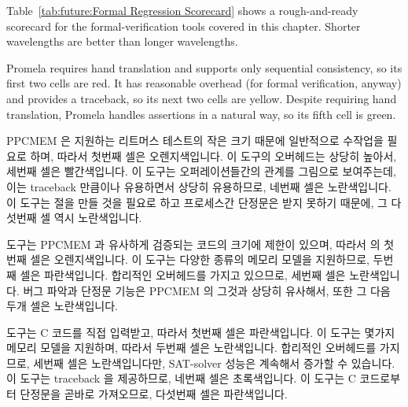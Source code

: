 Table~\ref{tab:future:Formal Regression Scorecard}
shows a rough-and-ready scorecard for the formal-verification tools
covered in this chapter.
Shorter wavelengths are better than longer wavelengths.

Promela requires hand translation and supports only sequential
consistency, so its first two cells are red.
It has reasonable overhead (for formal verification, anyway)
and provides a traceback, so its next two cells are yellow.
Despite requiring hand translation, Promela handles assertions
in a natural way, so its fifth cell is green.
\fi

PPCMEM 은 지원하는 리트머스 테스트의 작은 크기 때문에 일반적으로 수작업을
필요로 하며, 따라서 첫번째 셀은 오렌지색입니다.
이 도구의 오버헤드는 상당히 높아서, 세번째 셀은 빨간색입니다.
이 도구는 오퍼레이션들간의 관계를 그림으로 보여주는데, 이는 traceback 만큼이나
유용하면서 상당히 유용하므로, 네번째 셀은 노란색입니다.
이 도구는  절을 만들 것을 필요로 하고 프로세스간 단정문은 받지
못하기 때문에, 그 다섯번째 셀 역시 노란색입니다.

 도구는 PPCMEM 과 유사하게 검증되는 코드의 크기에 제한이 있으며,
따라서  의 첫번째 셀은 오렌지색입니다.
이 도구는 다양한 종류의 메모리 모델을 지원하므로, 두번째 셀은 파란색입니다.
합리적인 오버헤드를 가지고 있으므로, 세번째 셀은 노란색입니다.
버그 파악과 단정문 기능은 PPCMEM 의 그것과 상당히 유사해서,  또한 그
다음 두개 셀은 노란색입니다.
\iffalse

PPCMEM usually requires hand translation due to the small size of litmus
tests that it supports, so its first cell is orange.
It handles several memory models, so its second cell is green.
Its overhead is quite high, so its third cell is red.
It provides a graphical display of relations among operations, which
is not as helpful as a traceback, but is still quite useful, so its
fourth cell is yellow.
It requires constructing an \co{exists} clause and cannot take
intra-process assertions, so its fifth cell is also yellow.

The \co{herd} tool has size restrictions similar to those of PPCMEM,
so \co{herd}'s first cell is also orange.
It supports a wide variety of memory models, so its second cell is blue.
It has reasonable overhead, so its third cell is yellow.
Its bug-location and assertion capabilities are quite similar to those
of PPCMEM, so \co{herd} also gets yellow for the next two cells.
\fi

 도구는 C 코드를 직접 입력받고, 따라서 첫번째 셀은 파란색입니다.
이 도구는 몇가지 메모리 모델을 지원하며, 따라서 두번째 셀은 노란색입니다.
합리적인 오버헤드를 가지므로, 세번째 셀은 노란색입니다만, SAT-solver 성능은
계속해서 증가할 수 있습니다.
이 도구는 traceback 을 제공하므로, 네번째 셀은 초록색입니다.
이 도구는 C 코드로부터 단정문을 곧바로 가져오므로, 다섯번째 셀은 파란색입니다.

